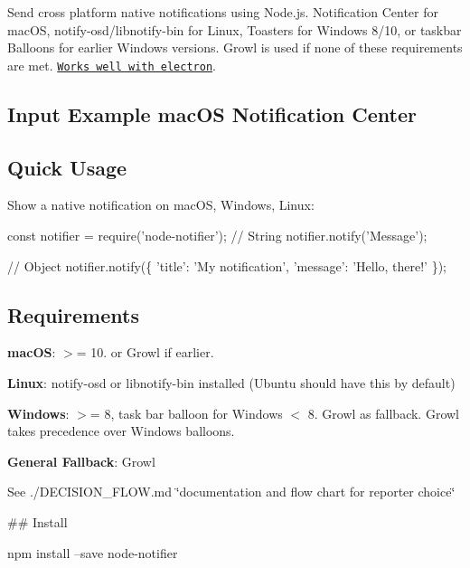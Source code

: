 Send cross platform native notifications using Node.\+js. Notification Center for mac\+OS, notify-\/osd/libnotify-\/bin for Linux, Toasters for Windows 8/10, or taskbar Balloons for earlier Windows versions. Growl is used if none of these requirements are met. \href{#within-electron-packaging}{\tt Works well with electron}.

 

\subsection*{Input Example mac\+OS Notification Center}



\subsection*{Quick Usage}

Show a native notification on mac\+OS, Windows, Linux\+:


\begin{DoxyCode}
const notifier = require('node-notifier');
// String
notifier.notify('Message');

// Object
notifier.notify(\{
  'title': 'My notification',
  'message': 'Hello, there!'
\});
\end{DoxyCode}


\subsection*{Requirements}


\begin{DoxyItemize}
\item {\bfseries mac\+OS}\+: $>$= 10. or Growl if earlier.
\item {\bfseries Linux}\+: {\ttfamily notify-\/osd} or {\ttfamily libnotify-\/bin} installed (Ubuntu should have this by default)
\item {\bfseries Windows}\+: $>$= 8, task bar balloon for Windows $<$ 8. Growl as fallback. Growl takes precedence over Windows balloons.
\item {\bfseries General Fallback}\+: Growl
\end{DoxyItemize}

See ./\+D\+E\+C\+I\+S\+I\+O\+N\+\_\+\+F\+L\+OW.md \char`\"{}documentation and flow chart for reporter choice\char`\"{}

\#\# Install 
\begin{DoxyCode}
npm install --save node-notifier
\end{DoxyCode}


